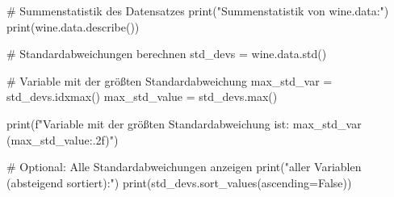 # Summenstatistik des Datensatzes
print("Summenstatistik von wine.data:")
print(wine.data.describe())

# Standardabweichungen berechnen
std_devs = wine.data.std()

# Variable mit der größten Standardabweichung
max_std_var = std_devs.idxmax()
max_std_value = std_devs.max()

print(f"\nDie Variable mit der größten Standardabweichung ist: {max_std_var} ({max_std_value:.2f})")

# Optional: Alle Standardabweichungen anzeigen
print("\nStandardabweichungen aller Variablen (absteigend sortiert):")
print(std_devs.sort_values(ascending=False))